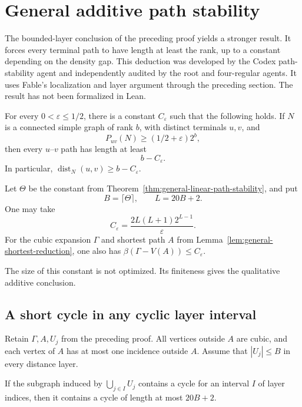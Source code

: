 \section{General additive path stability}
\label{sec:general-additive-path-stability}

The bounded-layer conclusion of the preceding proof yields a stronger result.
It forces every terminal path to have length at least the rank, up to a constant depending on the density gap.
This deduction was developed by the Codex path-stability agent and independently audited by the root and four-regular agents.
It uses Fable's localization and layer argument through the preceding section.
The result has not been formalized in Lean.

\begin{theorem}\label{thm:general-additive-path-stability}
For every $0<\varepsilon\le1/2$, there is a constant $C_\varepsilon$ such that the following holds.
If $N$ is a connected simple graph of rank $b$, with distinct terminals $u,v$, and
\[
 P_{uv}(N)\ge(1/2+\varepsilon)2^b,
\]
then every $u$--$v$ path has length at least
\[
 b-C_\varepsilon.
\]
In particular, $\operatorname{dist}_N(u,v)\ge b-C_\varepsilon$.

Let $\Theta$ be the constant from Theorem~\ref{thm:general-linear-path-stability}, and put
\[
 B=\lceil\Theta\rceil,\qquad L=20B+2.
\]
One may take
\begin{equation}\label{eq:general-additive-constant}
 C_\varepsilon=\frac{2L(L+1)2^{L-1}}{\varepsilon}.
\end{equation}
For the cubic expansion $\Gamma$ and shortest path $A$ from Lemma~\ref{lem:general-shortest-reduction},
one also has $\beta(\Gamma-V(A))\le C_\varepsilon$.
\end{theorem}

The size of this constant is not optimized.
Its finiteness gives the qualitative additive conclusion.

\subsection{A short cycle in any cyclic layer interval}

Retain $\Gamma,A,U_j$ from the preceding proof.
All vertices outside $A$ are cubic, and each vertex of $A$ has at most one incidence outside $A$.
Assume that $|U_j|\le B$ in every distance layer.

\begin{lemma}\label{lem:additive-minimum-span}
If the subgraph induced by $\bigcup_{j\in I}U_j$ contains a cycle for an interval $I$ of layer indices,
then it contains a cycle of length at most $20B+2$.
\end{lemma}

